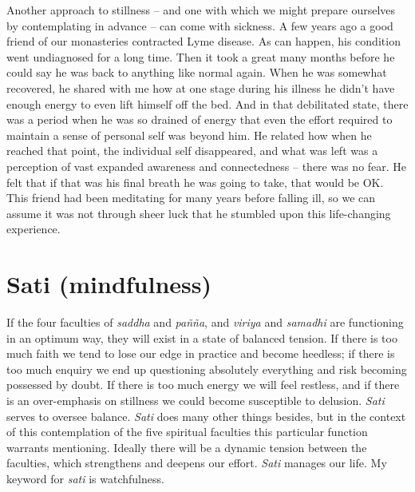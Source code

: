 Another approach to stillness -- and one with which we might prepare
ourselves by contemplating in advance -- can come with sickness. A few
years ago a good friend of our monasteries contracted Lyme
disease\cite{lyme}. As can happen, his condition went
undiagnosed for a long time. Then it took a great many months before he
could say he was back to anything like normal again. When he was
somewhat recovered, he shared with me how at one stage during his
illness he didn't have enough energy to even lift himself off the bed.
And in that debilitated state, there was a period when he was so drained
of energy that even the effort required to maintain a sense of personal
self was beyond him. He related how when he reached that point, the
individual self disappeared, and what was left was a perception of vast
expanded awareness and connectedness -- there was no fear. He felt that
if that was his final breath he was going to take, that would be OK.
This friend had been meditating for many years before falling ill, so we
can assume it was not through sheer luck that he stumbled upon this
life-changing experience.

\section{Sati (mindfulness)}

If the four faculties of \emph{saddha} and \emph{pañña}, and \emph{viriya} and
\emph{samadhi} are functioning in an optimum way, they will exist in a state
of balanced tension. If there is too much faith we tend to lose our edge
in practice and become heedless; if there is too much enquiry we end up
questioning absolutely everything and risk becoming possessed by doubt.
If there is too much energy we will feel restless, and if there is an
over-emphasis on stillness we could become susceptible to delusion.
\emph{Sati} serves to oversee balance. \emph{Sati} does many other things besides,
but in the context of this contemplation of the five spiritual faculties
this particular function warrants mentioning. Ideally there will be a
dynamic tension between the faculties, which strengthens and deepens our
effort. \emph{Sati} manages our life. My keyword for \emph{sati} is watchfulness.

